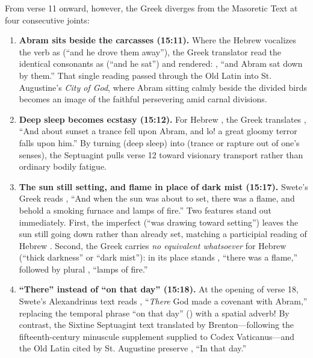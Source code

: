 From verse 11 onward, however, the Greek diverges from the Masoretic Text at four consecutive joints:

\begin{enumerate}
  \item \textbf{Abram sits beside the carcasses (15:11).} Where the Hebrew vocalizes the verb as  (``and he drove them away''), the Greek translator read the identical consonants as  (``and he sat'') and rendered: , ``and Abram sat down by them.'' That single reading passed through the Old Latin into St. Augustine's \emph{City of God}, where Abram sitting calmly beside the divided birds becomes an image of the faithful persevering amid carnal divisions.
  \item \textbf{Deep sleep becomes ecstasy (15:12).} For Hebrew , the Greek translates , ``And about sunset a trance fell upon Abram, and lo! a great gloomy terror falls upon him.'' By turning  (deep sleep) into  (trance or rapture out of one's senses), the Septuagint pulls verse 12 toward visionary transport rather than ordinary bodily fatigue.
  \item \textbf{The sun still setting, and flame in place of dark mist (15:17).} Swete's Greek reads , ``And when the sun was about to set, there was a flame, and behold a smoking furnace and lamps of fire.'' Two features stand out immediately. First, the imperfect  (``was drawing toward setting'') leaves the sun still going down rather than already set, matching a participial reading of Hebrew . Second, the Greek carries \emph{no equivalent whatsoever} for Hebrew  (``thick darkness'' or ``dark mist''): in its place stands , ``there was a flame,'' followed by plural , ``lamps of fire.''
  \item \textbf{``There'' instead of ``on that day'' (15:18).} At the opening of verse 18, Swete's Alexandrinus text reads , ``\emph{There} God made a covenant with Abram,'' replacing the temporal phrase ``on that day'' () with a spatial adverb! By contrast, the Sixtine Septuagint text translated by Brenton---following the fifteenth-century minuscule supplement supplied to Codex Vaticanus---and the Old Latin cited by St. Augustine preserve , ``In that day.''
\end{enumerate}

